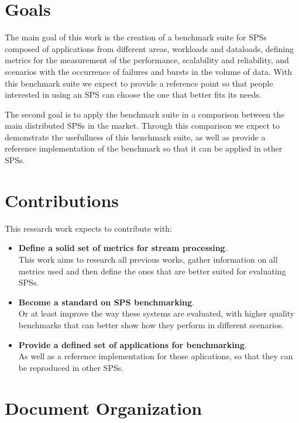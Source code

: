 \documentclass[ppgc,diss,english]{iiufrgs}
\begin{document}
\section{Goals}

The main goal of this work is the creation of a benchmark suite for SPSs composed of applications from different areas, workloads and dataloads, defining metrics for the measurement of the performance, scalability and reliability, and scenarios with the occurrence of failures and bursts in the volume of data. With this benchmark suite we expect to provide a reference point so that people interested in using an SPS can choose the one that better fits its needs.

The second goal is to apply the benchmark suite in a comparison between the main distributed SPSs in the market. Through this comparison we expect to demonstrate the usefullness of this benchmark suite, as well as provide a reference implementation of the benchmark so that it can be applied in other SPSs.

\section{Contributions}

This research work expects to contribute with:

\begin{itemize}
\item \textbf{Define a solid set of metrics for stream processing}.\\
	  This work aims to research all previous works, gather information on all metrics used and then define the ones that are better suited for evaluating SPSs.

\item \textbf{Become a standard on SPS benchmarking}.\\
      Or at least improve the way these systems are evaluated, with higher quality benchmarks that can better show how they perform in different scenarios.
      
\item \textbf{Provide a defined set of applications for benchmarking}.\\
      As well as a reference implementation for those aplications, so that they can be reproduced in other SPSs.
      

\end{itemize}


\section{Document Organization}
\end{document}

